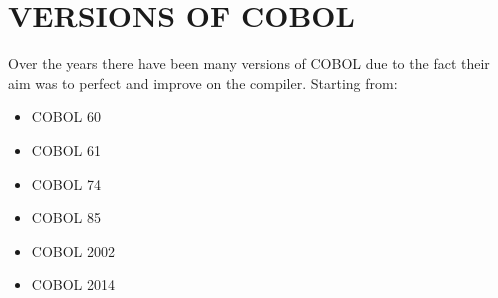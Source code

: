 \documentclass{article}
\begin{document}
	\section{VERSIONS OF COBOL}
	Over the years there have been many versions of COBOL due to the fact their aim was to perfect and improve on the compiler. 
	Starting from:
	\begin{itemize}
		\item COBOL 60
		\item COBOL 61
		\item COBOL 74
		\item COBOL 85
		\item COBOL 2002
		\item COBOL 2014
	\end{itemize}
\end{document}
